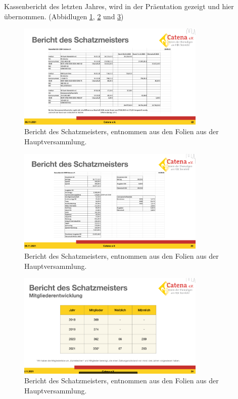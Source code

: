 \documentclass[a4paper, 11pt]{article}
\begin{document}
Kassenbericht des letzten Jahres, wird in der Präentation gezeigt und hier übernommen. (Abbidlugen \ref{fig:kasse1}, \ref{fig:kasse2} und \ref{fig:kasse3})

\begin{figure}
    \centering
    \includegraphics[width=0.8\textwidth]{schatz1}
    \caption{Bericht des Schatzmeisters, entnommen aus den Folien aus der Hauptversammlung.}
    \label{fig:kasse1}
\end{figure}

\begin{figure}
    \centering
    \includegraphics[width=0.8\textwidth]{schatz2}
    \caption{Bericht des Schatzmeisters, entnommen aus den Folien aus der Hauptversammlung.}
    \label{fig:kasse2}
\end{figure}

\begin{figure}
    \centering
    \includegraphics[width=0.8\textwidth]{schatz3}
    \caption{Bericht des Schatzmeisters, entnommen aus den Folien aus der Hauptversammlung.}
    \label{fig:kasse3}
\end{figure}
\end{document}
